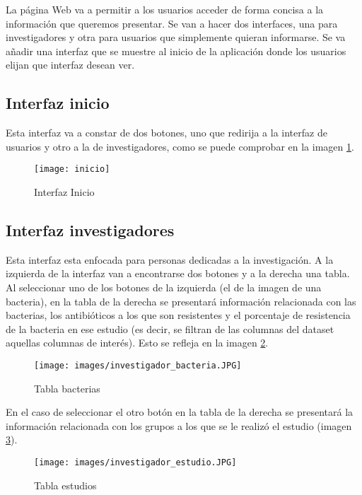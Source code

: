 \documentclass[../main.tex]{subfiles}
\begin{document}
La página Web va a permitir a los usuarios acceder de forma concisa a la información que queremos presentar. Se van a hacer dos interfaces, una para investigadores y otra para usuarios que simplemente quieran informarse. Se va añadir una interfaz que se muestre al inicio de la aplicación donde los usuarios elijan que interfaz desean ver.

\subsection{Interfaz inicio}

Esta interfaz va a constar de dos botones, uno que redirija a la interfaz de usuarios y otro a la de investigadores, como se puede comprobar en la imagen \ref{inc}.

\begin{figure}[ht]
    \centering
    \texttt{[image: inicio]}
    \caption{Interfaz Inicio}
    \label{inc}
\end{figure}

\subsection{Interfaz investigadores}

Esta interfaz esta enfocada para personas dedicadas a la investigación. A la izquierda de la interfaz van a encontrarse dos botones y a la derecha una tabla. Al seleccionar uno de los botones de la izquierda (el de la imagen de una bacteria), en la tabla de la derecha se presentará información relacionada con las bacterias, los antibióticos a los que son resistentes y el porcentaje de resistencia de la bacteria en ese estudio (es decir, se filtran de las columnas del dataset aquellas columnas de interés). Esto se refleja en la imagen \ref{invBac}.

\begin{figure}[ht]
    \centering
    \texttt{[image: images/investigador\_bacteria.JPG]}
    \caption{Tabla bacterias}
    \label{invBac}
\end{figure}


En el caso de seleccionar el otro botón en la tabla de la derecha se presentará la información relacionada con los grupos a los que se le realizó el estudio (imagen  \ref{invEst}).

\begin{figure}[ht]
    \centering
    \texttt{[image: images/investigador\_estudio.JPG]}
    \caption{Tabla estudios}
    \label{invEst}
\end{figure}
\end{document}

